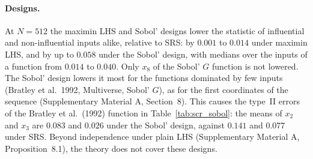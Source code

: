 \documentclass[11pt,a4paper]{article}
\begin{document}
\paragraph{Designs.} At $N=512$ the maximin LHS and Sobol' designs lower the statistic of influential and non-influential inputs alike, relative to SRS: by $0.001$ to $0.014$ under maximin LHS, and by up to $0.058$ under the Sobol' design, with medians over the inputs of a function from $0.014$ to $0.040$. Only $x_8$ of the Sobol' $G$ function is not lowered. The Sobol' design lowers it most for the functions dominated by few inputs (Bratley et al.\ 1992, Multiverse, Sobol' $G$), as for the first coordinates of the sequence (Supplementary Material A, Section~8). This causes the type~II errors of the Bratley et al.\ (1992) function in Table~\ref{tab:scr_sobol}: the means of $x_2$ and $x_3$ are $0.083$ and $0.026$ under the Sobol' design, against $0.141$ and $0.077$ under SRS. Beyond independence under plain LHS (Supplementary Material A, Proposition~8.1), the theory does not cover these designs.
\end{document}
